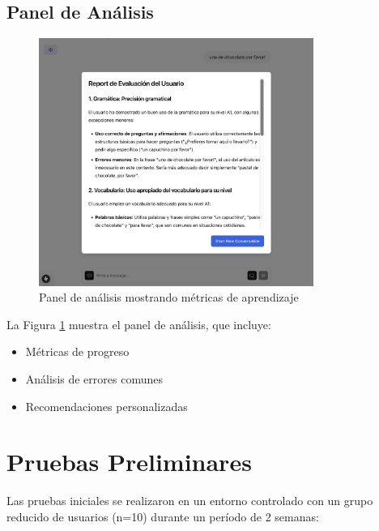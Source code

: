 \subsection{Panel de Análisis}
\label{panel-analisis}

\begin{figure}[H]
    \centering
    \includegraphics[width=0.8\textwidth]{figuras/screenshots/report.png}
    \caption{Panel de análisis mostrando métricas de aprendizaje}
    \label{fig:analytics-panel}
\end{figure}

La Figura \ref{fig:analytics-panel} muestra el panel de análisis, que incluye:
\begin{itemize}
    \item Métricas de progreso
    \item Análisis de errores comunes
    \item Recomendaciones personalizadas
\end{itemize}

\section{Pruebas Preliminares}
\label{pruebas-preliminares}

Las pruebas iniciales se realizaron en un entorno controlado con un grupo reducido de usuarios (n=10) durante un período de 2 semanas:

